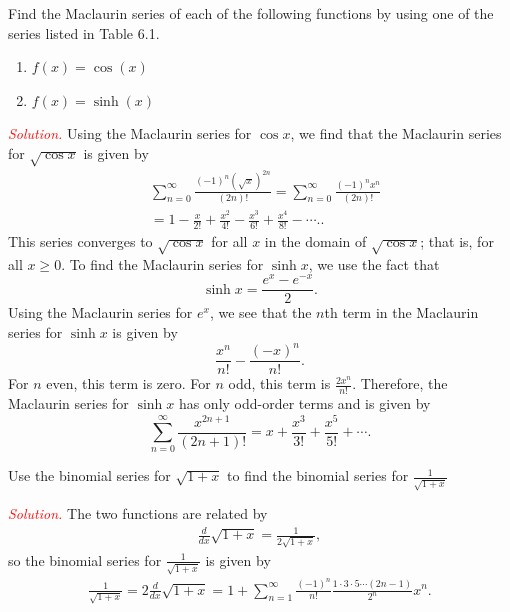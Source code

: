 \documentclass{report}
\begin{document}
    \bigbreak \noindent 
    \begin{exm}
        Find the Maclaurin series of each of the following functions by using one of the series listed in Table 6.1.
        \begin{enumerate}[label=(\alph*)]
            \item $f(x) = \cos{(x)} $
            \item $f(x) = \sinh{(x)} $
        \end{enumerate}
    \end{exm}
    \bigbreak \noindent 
    \textcolor{red}{\textit{Solution.}}
    Using the Maclaurin series for $\cos x$, we find that the Maclaurin series for $\sqrt{\cos x}$ is given by
    \begin{align*}
        &\sum_{n=0}^{\infty} \frac{(-1)^n (\sqrt{x})^{2n}}{(2n)!} = \sum_{n=0}^{\infty} \frac{(-1)^n x^n}{(2n)!}  \\
        &= 1 - \frac{x}{2!} + \frac{x^2}{4!} - \frac{x^3}{6!} + \frac{x^4}{8!} - \cdots.
    .\end{align*}
    \bigbreak \noindent
    This series converges to $\sqrt{\cos x}$ for all $x$ in the domain of $\sqrt{\cos x}$; that is, for all $x \geq 0$.
    \bigbreak \noindent 
    To find the Maclaurin series for $\sinh x$, we use the fact that
    \[
    \sinh x = \frac{e^x - e^{-x}}{2}.
    \]
    \bigbreak \noindent
    Using the Maclaurin series for $e^x$, we see that the $n$th term in the Maclaurin series for $\sinh x$ is given by
    \[
    \frac{x^n}{n!} - \frac{(-x)^n}{n!}.
    \]
    \bigbreak \noindent
    For $n$ even, this term is zero. For $n$ odd, this term is $\frac{2x^n}{n!}$. Therefore, the Maclaurin series for $\sinh x$ has only odd-order terms and is given by
    \[
    \sum_{n=0}^{\infty} \frac{x^{2n+1}}{(2n+1)!} = x + \frac{x^3}{3!} + \frac{x^5}{5!} + \cdots.
    \]

    \pagebreak 
    \begin{exm}
        Use the binomial series for $\sqrt{1+x}$ to find the binomial series for $\frac{1}{\sqrt{1+x}} $ 
        
    \end{exm}
    \bigbreak \noindent 
    \textcolor{red}{\textit{Solution.}}
    \bigbreak
\noindent The two functions are related by
\begin{align*}
\frac{d}{dx}\sqrt{1+x} = \frac{1}{2\sqrt{1+x}},
\end{align*}
so the binomial series for $\frac{1}{\sqrt{1+x}}$ is given by
\begin{align*}
\frac{1}{\sqrt{1+x}} = 2 \frac{d}{dx}\sqrt{1+x} = 1 + \sum_{n=1}^{\infty} \frac{(-1)^n}{n!} \frac{1 \cdot 3 \cdot 5 \cdots (2n-1)}{2^n} x^n.
\end{align*}
\bigbreak \noindent 
    
\end{document}
